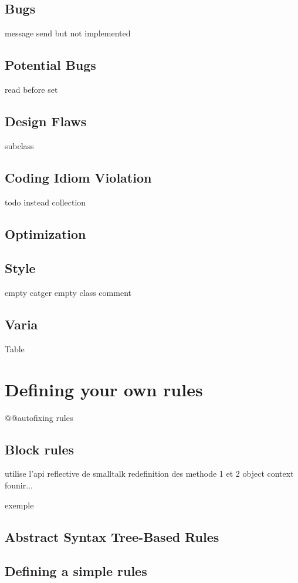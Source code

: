 \documentclass[a4paper,10pt,twoside]{book}
\begin{document}
\subsection{Bugs}
	message send but not implemented

\subsection{Potential Bugs}
	read before set

\subsection{Design Flaws}
	subclass
		
\subsection{Coding Idiom Violation}
	todo instead collection


\subsection{Optimization}
\subsection{Style}
	empty catger
	empty class comment

\subsection{Varia}


Table


\section{Defining your own rules}
@@autofixing rules

\subsection{Block rules}
utilise l'api reflective de smalltalk
redefinition des methode 1 et 2
object context founir...

exemple

\subsection{Abstract Syntax Tree-Based Rules}

\subsection{Defining a simple rules}
\end{document}
